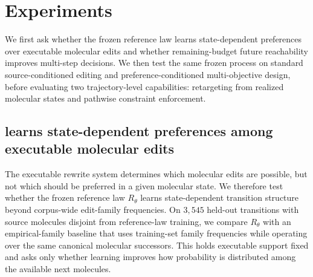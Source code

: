 %
\section{Experiments}
\label{sec:experiments}

We first ask whether the frozen reference law learns state-dependent preferences over executable molecular edits and whether remaining-budget future reachability improves multi-step decisions. We then test the same frozen process on standard source-conditioned editing and preference-conditioned multi-objective design, before evaluating two trajectory-level capabilities: retargeting from realized molecular states and pathwise constraint enforcement.

\subsection{\method{} learns state-dependent preferences among executable molecular edits}
\label{sec:exp-rtheta}

The executable rewrite system determines which molecular edits are possible, but not which should be preferred in a given molecular state. We therefore test whether the frozen reference law $R_\theta$ learns state-dependent transition structure beyond corpus-wide edit-family frequencies. On $3{,}545$ held-out transitions with source molecules disjoint from reference-law training, we compare $R_\theta$ with an empirical-family baseline that uses training-set family frequencies while operating over the same canonical molecular successors. This holds executable support fixed and asks only whether learning improves how probability is distributed among the available next molecules.


